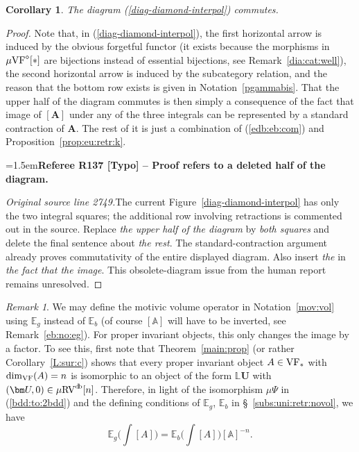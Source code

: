\documentclass[12pt]{amsart}
\newcommand{\RefereeRemark}[4]{%
  \par\medskip\begingroup\normalfont\small\color{RefereePurple}%
  \emergencystretch=1.5em\noindent\textbf{Referee R#1 [#2] -- #3.}\par\nobreak\noindent #4\par
  \endgroup\medskip
}
\theoremstyle{plain}
\newtheorem{cor}[thm]{Corollary}
\theoremstyle{definition}
\theoremstyle{remark}
\newtheorem{rem}[thm]{Remark}
\numberwithin{equation}{section}
\theoremstyle{plain}
\newcommand{\VF}{\textup{VF}}
\newcommand{\RV}{\textup{RV}}
\newcommand{\A}{\mathds{A}}
\newcommand{\0}{\emptyset}
\newcommand{\bb}[1]{\mathbb{#1}}
\newcommand{\mgVF}{{\mu} {\VF}}
\newcommand{\mgRV}{{\mu}{\RV}}
\DeclareMathOperator{\db}{d \! b}
\begin{document}
\begin{cor}\label{db:to:novol}
The diagram (\ref{diag-diamond-interpol}) commutes.
\end{cor}
\begin{proof}
Note that, in (\ref{diag-diamond-interpol}),  the first horizontal arrow  is induced by the obvious forgetful functor (it exists
because the morphisms in $\mgVF^\diamond[*]$ are bijections instead of essential bijections, see Remark~\ref{dia:cat:well}), the second horizontal arrow is induced by the subcategory relation, and the reason that the bottom row exists is given in Notation~\ref{pgammabis}. That the upper half of the diagram commutes is then simply a consequence of the fact that image of $[\bm A]$ under any of the three integrals  can be represented by a standard contraction of $\bm A$. The rest of it is just a combination of (\ref{edb:eb:com}) and Proposition~\ref{prop:eu:retr:k}.

\RefereeRemark{137}{Typo}{Proof refers to a deleted half of the diagram}{%
\textit{Original source line 2749.}\quad The current Figure~\ref{diag-diamond-interpol} has only the two integral squares; the additional row involving retractions is commented out in the source. Replace \emph{the upper half of the diagram} by \emph{both squares} and delete the final sentence about \emph{the rest}. The standard-contraction argument already proves commutativity of the entire displayed diagram. Also insert \emph{the} in \emph{the fact that the image}. This obsolete-diagram issue from the human report remains unresolved.
}
\end{proof}


\begin{rem}\label{eg:eb:factor}
We may define the motivic volume operator in Notation~\ref{mov:vol} using $\bb E_g$ instead of $\bb E_b$ (of course $[\A]$ will have to be inverted, see Remark~\ref{eb:no:eg}).
For proper invariant objects, this only changes the image by a factor. To see this, first note that  Theorem~\ref{main:prop} (or rather Corollary~\ref{L:sur:c}) shows that every proper invariant object $A \in \VF_*$ with $\dim_{\VF}(A) = n$ is isomorphic to an object of the form $\bb L \bm U$ with $(\bm U, 0) \in  \mgRV^{\db}[n]$. Therefore, in light of the isomorphism ${\mu}\Psi$ in (\ref{bdd:to:2bdd}) and the defining conditions of $\bb E_g$, $\bb E_b$ in \S~\ref{subs:uni:retr:novol}, we have
\begin{equation}\label{off:fac:A}
\bb E_g \Big (\int [A] \Big ) = \bb E_b \Big (\int [A] \Big )[\A]^{-n}.
\end{equation}
\end{rem}
\end{document}
